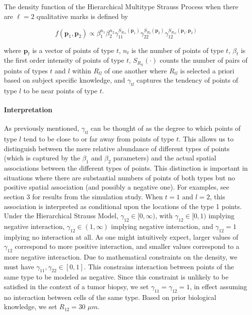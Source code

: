 \documentclass[
]{book}
\begin{document}
The density function of the Hierarchical Multitype Strauss Process when there are \(\ell = 2\) qualitative marks
is defined by

\begin{equation}
\label{eqn:density}
f({\mathbf{p}}_1, {\mathbf{p}}_2) \propto 
\beta_1^{n_1} \beta_2^{n_2}
\gamma_{11}^{S_{R_{11}}({\mathbf{p}}_1)}
\gamma_{22}^{S_{R_{2}}({\mathbf{p}}_2)}
\gamma_{12}^{S_{R_{12}}({\mathbf{p}}_1, {\mathbf{p}}_2)}
\tag{1}  
\end{equation}

where \({\mathbf{p}}_t\) is a vector of points of type \(t\), \(n_t\) is the number of points of type \(t\), \(\beta_t\) is the first order intensity of points of type \(t\), \(S_{R_{tl}}(\cdot)\) counts the number of pairs of points of types \(t\) and \(l\) within \(R_{tl}\) of one another where \(R_{tl}\) is selected a priori based on subject specific knowledge, and \(\gamma_{tl}\) captures the tendency of points of type \(l\) to be near points of type \(t\).

\paragraph{\textbf{Interpretation}}

As previously mentioned, \(\gamma_{tl}\) can be thought of as the
degree to which points of type \(l\) tend to be close to or far away
from points of type \(t\). This allows us to distinguish between
the mere relative abundance of different types of points (which is
captured by the \(\beta_1\) and \(\beta_2\) parameters) and the
actual spatial associations between the different types of points.
This distinction is important in situations where there are
substantial numbers of points of both types but no positive
spatial association (and possibly a negative one). For examples,
see section 3 for results from the simulation study. When
\(t = 1\) and \(l = 2\), this association
is interpreted as conditional upon the locations of the type 1
points. Under the Hierarchical Strauss Model,
\(\gamma_{12} \in [0, \infty)\), with \(\gamma_{12} \in [0,1)\)
implying negative interaction, \(\gamma_{12} \in (1, \infty)\)
implying negative interaction, and \(\gamma_{12} = 1\) implying
no interaction at all. As one might intuitively expect, larger values of
\(\gamma_{12}\) correspond to more positive interaction, and
smaller values correspond to a more negative interaction. Due to mathematical constraints on the density,
we must have \(\gamma_{11}, \gamma_{22} \in [0,1]\). This
constrains interaction between points of the same
type to be modeled as negative. Since this constraint is unlikely
to be satisfied in the context of a tumor biopsy, we set
\(\gamma_{11} = \gamma_{12} = 1\), in effect assuming no
interaction between cells of the same type. Based on prior
biological knowledge, we set \(R_{12} = 30\) \(\mu m\).
\end{document}
